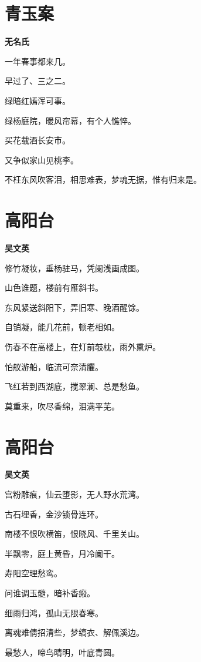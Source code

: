 \documentclass[12pt,a4paper]{ctexbook}
\begin{document}
\section{青玉案}
\textbf{无名氏}\par\vspace{0.5em}
一年春事都来几。\par
早过了、三之二。\par
绿暗红嫣浑可事。\par
绿杨庭院，暖风帘幕，有个人憔悴。\par
买花载酒长安市。\par
又争似家山见桃李。\par
不枉东风吹客泪，相思难表，梦魂无据，惟有归来是。\par

\section{高阳台}
\textbf{吴文英}\par\vspace{0.5em}
修竹凝妆，垂杨驻马，凭阑浅画成图。\par
山色谁题，楼前有雁斜书。\par
东风紧送斜阳下，弄旧寒、晚酒醒馀。\par
自销凝，能几花前，顿老相如。\par
伤春不在高楼上，在灯前攲枕，雨外熏炉。\par
怕舣游船，临流可奈清臞。\par
飞红若到西湖底，搅翠澜、总是愁鱼。\par
莫重来，吹尽香绵，泪满平芜。\par

\section{高阳台}
\textbf{吴文英}\par\vspace{0.5em}
宫粉雕痕，仙云堕影，无人野水荒湾。\par
古石埋香，金沙锁骨连环。\par
南楼不恨吹横笛，恨晓风、千里关山。\par
半飘零，庭上黄昏，月冷阑干。\par
寿阳空理愁鸾。\par
问谁调玉髓，暗补香瘢。\par
细雨归鸿，孤山无限春寒。\par
离魂难倩招清些，梦缟衣、解佩溪边。\par
最愁人，啼鸟晴明，叶底青圆。\par
\end{document}
